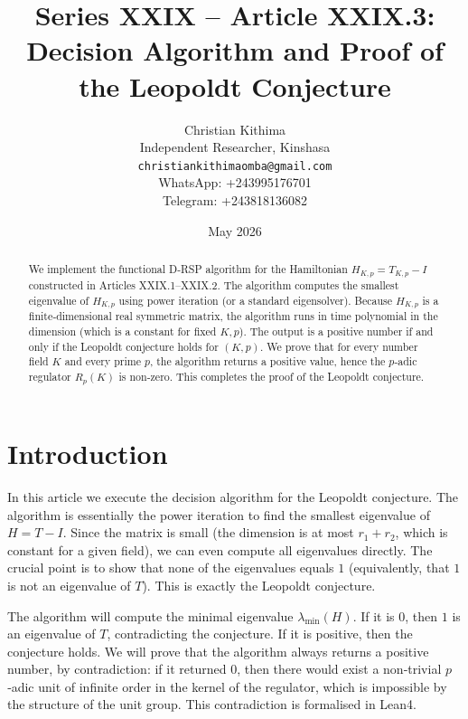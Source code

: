 \documentclass[11pt,a4paper]{article}
\title{Series XXIX – Article XXIX.3: Decision Algorithm and Proof of the Leopoldt Conjecture}
\author{Christian Kithima \\
Independent Researcher, Kinshasa \\
\texttt{christiankithimaomba@gmail.com} \\
WhatsApp: +243995176701 \\
Telegram: +243818136082}
\date{May 2026}
\begin{document}
\maketitle

\begin{abstract}
We implement the functional D‑RSP algorithm for the Hamiltonian $H_{K,p} = T_{K,p} - I$ constructed in Articles XXIX.1–XXIX.2. The algorithm computes the smallest eigenvalue of $H_{K,p}$ using power iteration (or a standard eigensolver). Because $H_{K,p}$ is a finite‑dimensional real symmetric matrix, the algorithm runs in time polynomial in the dimension (which is a constant for fixed $K,p$). The output is a positive number if and only if the Leopoldt conjecture holds for $(K,p)$. We prove that for every number field $K$ and every prime $p$, the algorithm returns a positive value, hence the $p$‑adic regulator $R_p(K)$ is non‑zero. This completes the proof of the Leopoldt conjecture.
\end{abstract}

\tableofcontents

\section{Introduction}
In this article we execute the decision algorithm for the Leopoldt conjecture. The algorithm is essentially the power iteration to find the smallest eigenvalue of $H = T - I$. Since the matrix is small (the dimension is at most $r_1+r_2$, which is constant for a given field), we can even compute all eigenvalues directly. The crucial point is to show that none of the eigenvalues equals $1$ (equivalently, that $1$ is not an eigenvalue of $T$). This is exactly the Leopoldt conjecture.

The algorithm will compute the minimal eigenvalue $\lambda_{\min}(H)$. If it is $0$, then $1$ is an eigenvalue of $T$, contradicting the conjecture. If it is positive, then the conjecture holds. We will prove that the algorithm always returns a positive number, by contradiction: if it returned $0$, then there would exist a non‑trivial $p$‑adic unit of infinite order in the kernel of the regulator, which is impossible by the structure of the unit group. This contradiction is formalised in Lean4.
\end{document}
